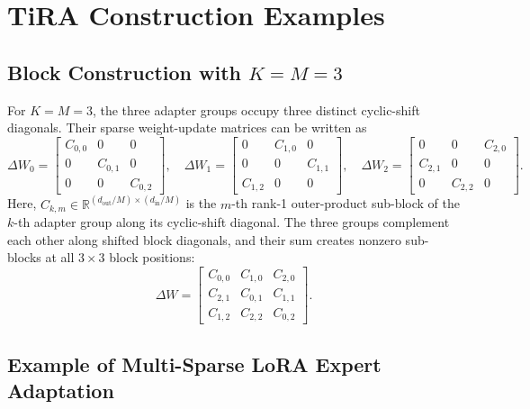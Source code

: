 \documentclass[a4paper,11pt]{article}
\newcommand{\R}{\mathbb{R}}
\newcommand{\DeltaW}{\Delta W}
\begin{document}
\appendix

\section{TiRA Construction Examples}

\subsection{\texorpdfstring{Block Construction with $K=M=3$}{Block Construction with K=M=3}}
\label{app:k3m3}

For $K=M=3$, the three adapter groups occupy three distinct cyclic-shift diagonals. Their sparse weight-update matrices can be written as
\begin{equation}
\Delta W_0=
\begin{bmatrix}
C_{0,0} & 0 & 0\\
0 & C_{0,1} & 0\\
0 & 0 & C_{0,2}
\end{bmatrix},\quad
\Delta W_1=
\begin{bmatrix}
0 & C_{1,0} & 0\\
0 & 0 & C_{1,1}\\
C_{1,2} & 0 & 0
\end{bmatrix},\quad
\Delta W_2=
\begin{bmatrix}
0 & 0 & C_{2,0}\\
C_{2,1} & 0 & 0\\
0 & C_{2,2} & 0
\end{bmatrix}.
\end{equation}
Here, $C_{k,m}\in\R^{(d_{\mathrm{out}}/M)\times(d_{\mathrm{in}}/M)}$ is the $m$-th rank-1 outer-product sub-block of the $k$-th adapter group along its cyclic-shift diagonal. The three groups complement each other along shifted block diagonals, and their sum creates nonzero sub-blocks at all $3\times3$ block positions:
\begin{equation}
\DeltaW=
\begin{bmatrix}
C_{0,0} & C_{1,0} & C_{2,0}\\
C_{2,1} & C_{0,1} & C_{1,1}\\
C_{1,2} & C_{2,2} & C_{0,2}
\end{bmatrix}.
\end{equation}

\subsection{Example of Multi-Sparse LoRA Expert Adaptation}
\label{app:sparse_expert}
\end{document}
